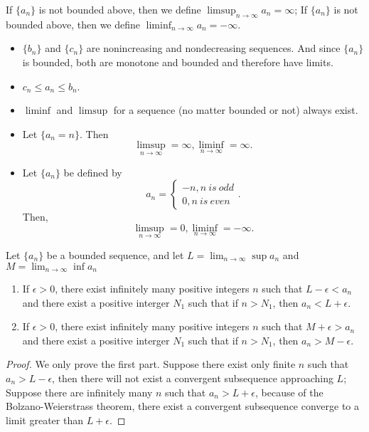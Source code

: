\begin{refsection}
\begin{definition}
If $\{a_n\}$ is not bounded above, then we define $\limsup_{n\to \infty} a_n = \infty$;
If $\{a_n\}$ is not bounded above, then we define $\liminf_{n\to \infty} a_n = -\infty$.
\end{definition}


\begin{remark}[interpretation]\hfill
\begin{itemize}
    \item $\{b_n\}$ and $\{c_n\}$ are nonincreasing and nondecreasing sequences. And since $\{a_n\}$ is bounded, both are monotone and bounded and therefore have limits.
    \item $c_n\leq a_n \leq b_n$.
    \item $\liminf$ and $\limsup$ for a sequence (no matter bounded or not) always exist. 
\end{itemize}
\end{remark}

\begin{example}\hfill
\begin{itemize}
	\item Let $\{a_n = n\}$. Then $$\limsup_{n\to \infty} = \infty,\liminf_{n\to \infty} = \infty. $$
	
	\item Let $\{a_n\}$ be defined by
	$$a_n = \begin{cases}
	-n, n ~is~odd \\
	0, n ~is~even
	\end{cases}.$$
	Then, 
	$$\limsup_{n\to \infty} = 0,\liminf_{n\to \infty} = -\infty. $$
\end{itemize}
\end{example}



\begin{theorem}\cite{johnsonbaugh2010foundations}
Let $\{a_n\}$ be a bounded sequence, and let $L = \lim_{n\rightarrow \infty} \sup a_n$ and $M = \lim_{n\rightarrow \infty} \inf a_n$ 
\begin{enumerate}
    \item If $\epsilon > 0$, there exist infinitely many positive integers $n$ such that $L-\epsilon  < a_n$ and there exist a positive interger $N_1$ such that if $n > N_1$, then $a_n < L + \epsilon$.
    \item If $\epsilon > 0$, there exist infinitely many positive integers $n$ such that $M+\epsilon  > a_n$ and there exist a positive interger $N_1$ such that if $n > N_1$, then $a_n > M - \epsilon$.
\end{enumerate}
\end{theorem}
\begin{proof}
We only prove the first part. Suppose there exist only finite $n$ such that $a_n > L -\epsilon$, then there will not exist a convergent subsequence approaching $L$; Suppose there are infinitely many $n$ such that $a_n > L + \epsilon$, because of the Bolzano-Weierstrass theorem, there exist a convergent subsequence converge to a limit greater than $L+\epsilon$.	
\end{proof}



\end{refsection}
